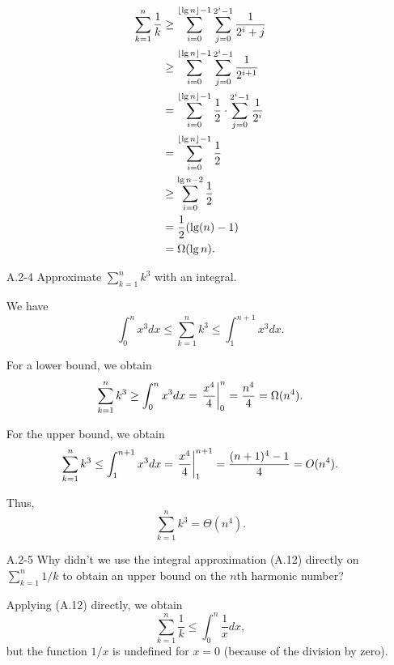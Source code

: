 \begin{enumerate}
\begin{framed}
\begin{equation*}
\begin{aligned}
  \sum_{k = 1}^n \frac{1}{k} &\ge \sum_{i = 0}^{\lfloor\lg n\rfloor - 1} \sum_{j = 0}^{2^i - 1} \frac{1}{2^i + j}\\
                             &\ge \sum_{i = 0}^{\lfloor\lg n\rfloor - 1} \sum_{j = 0}^{2^i - 1} \frac{1}{2^{i + 1}}\\
                             &=   \sum_{i = 0}^{\lfloor\lg n\rfloor - 1} \frac{1}{2} \cdot \sum_{j = 0}^{2^i - 1} \frac{1}{2^{i}}\\
                             &=   \sum_{i = 0}^{\lfloor\lg n\rfloor - 1} \frac{1}{2}\\
                             &\ge \sum_{i = 0}^{\lg n - 2} \frac{1}{2}\\
                             &=   \frac{1}{2} (\lg (n) - 1)\\
                             &=   \Omega(\lg n).
\end{aligned}
\end{equation*}
\end{framed}

\newpage

\item[A.2{-}4] {Approximate $\sum_{k = 1}^{n} k^3$ with an integral.}

\begin{framed}
We have
\[
  \int_{0}^{n} x^3 dx \le \sum_{k = 1}^{n} k^3 \le \int_{1}^{n + 1} x^3 dx.
\]

For a lower bound, we obtain
\[
  \sum_{k = 1}^{n} k^3 \ge \int_{0}^{n} x^3 dx = \left.\frac{x^4}{4}\right\rvert_{0}^{n} = \frac{n^4}{4} = \Omega(n^4).
\]

For the upper bound, we obtain
\[
  \sum_{k = 1}^{n} k^3 \le \int_{1}^{n + 1} x^3 dx = \left.\frac{x^4}{4}\right\rvert_{1}^{n + 1} = \frac{(n + 1)^4 - 1}{4} = O(n^4).
\]

Thus,
\[
  \sum_{k = 1}^{n} k^3 = \Theta(n^4).
\]


\end{framed}

\item[A.2{-}5] {Why didn't we use the integral approximation (A.12) directly on
$\sum_{k = 1}^{n} 1/k$ to obtain an upper bound on the $n$th harmonic number?}

\begin{framed}
Applying (A.12) directly, we obtain
\[
  \sum_{k = 1}^{n} \frac{1}{k} \le \int_{0}^{n} \frac{1}{x} dx,
\]
but the function $1/x$ is undefined for $x = 0$ (because of the division by
zero).
\end{framed}

\end{enumerate}

